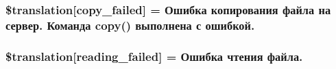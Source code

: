 \subsubsection[{\$translation}]{\setlength{\rightskip}{0pt plus 5cm}\$translation\mbox{[}\textquotesingle{}copy\+\_\+failed\textquotesingle{}\mbox{]} = \textquotesingle{}Ошибка копирования файла на сервер. Команда copy() выполнена с ошибкой.\textquotesingle{}}\label{class_8upload_8ru___r_u_8php_a783c9358bcf54a054545b50098bc679b}
\hypertarget{class_8upload_8ru___r_u_8php_a01bea14c9fd5f353f62db44beabfcd42}{}
\subsubsection[{\$translation}]{\setlength{\rightskip}{0pt plus 5cm}\$translation\mbox{[}\textquotesingle{}reading\+\_\+failed\textquotesingle{}\mbox{]} = \textquotesingle{}Ошибка чтения файла.\textquotesingle{}}\label{class_8upload_8ru___r_u_8php_a01bea14c9fd5f353f62db44beabfcd42}

